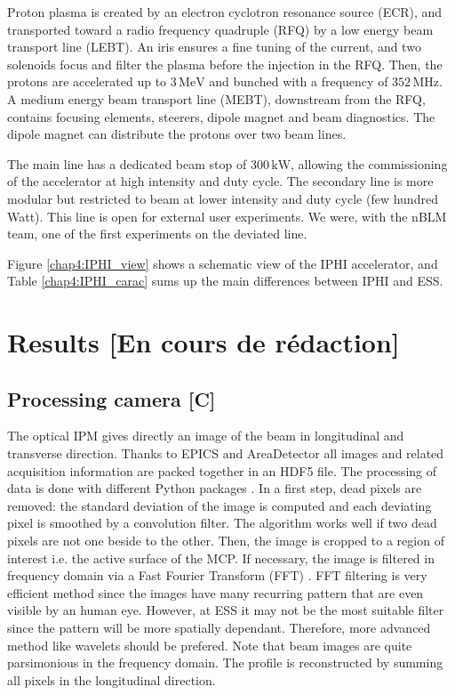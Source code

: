 \begin{refsection}
  Proton plasma is created by an electron cyclotron resonance source (ECR), and transported toward a radio frequency quadruple (RFQ) by a low energy beam transport line (LEBT).
  An iris ensures a fine tuning of the current, and two solenoids focus and filter the plasma before the injection in the RFQ.
  Then, the protons are accelerated up to $3\,\mathrm{MeV}$ and bunched with a frequency of $352\,\mathrm{MHz}$.
  A medium energy beam transport line (MEBT), downstream from the RFQ, contains focusing elements, steerers, dipole magnet and beam diagnostics.
  The dipole magnet can distribute the protons over two beam lines.

  

  The main line has a dedicated beam stop of $300\,\mathrm{kW}$, allowing the commissioning of the accelerator at high intensity and duty cycle.
  The secondary line is more modular but restricted to beam at lower intensity and duty cycle (few hundred Watt).
  This line is open for external user experiments.
  We were, with the nBLM team, one of the first experiments on the deviated line\cite{Senee:IPAC2018-TUPAF016}.

  Figure \ref{chap4:IPHI_view} shows a schematic view of the IPHI accelerator, and Table \ref{chap4:IPHI_carac} sums up the main differences between IPHI and ESS.
  

  \section{Results [En cours de rédaction]}
  \subsection{Processing camera [C]}
  The optical IPM gives directly an image of the beam in longitudinal and transverse direction. Thanks to EPICS and AreaDetector all images and related acquisition information are packed together in an HDF5 file. The processing of data is done with different Python packages \cite{NumPy2011,SciPy2019,Hunter2007}. In a first step, dead pixels are removed: the standard deviation of the image is computed and each deviating pixel is smoothed by a convolution filter. The algorithm works well if two dead pixels are not one beside to the other. Then, the image is cropped to a region of interest i.e. the active surface of the MCP.  If necessary, the image is filtered in frequency domain via a Fast Fourier Transform (FFT) \cite{Burrus2012}. FFT filtering is very efficient method since the images have many recurring pattern that are even visible by an human eye. However, at ESS it may not be the most suitable filter since the pattern will be more spatially dependant. Therefore, more advanced method like wavelets \cite{Burrus1997,bultheel2014} should be prefered. Note that beam images are quite parsimonious in the frequency domain. The profile is reconstructed by summing all pixels in the longitudinal direction.


\end{refsection}
